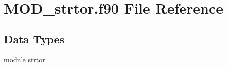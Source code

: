 \hypertarget{MOD__strtor_8f90}{\section{M\-O\-D\-\_\-strtor.\-f90 File Reference}
\label{MOD__strtor_8f90}
}
\subsection*{Data Types}
\begin{DoxyCompactItemize}
\item 
module \hyperlink{classstrtor}{strtor}
\end{DoxyCompactItemize}
